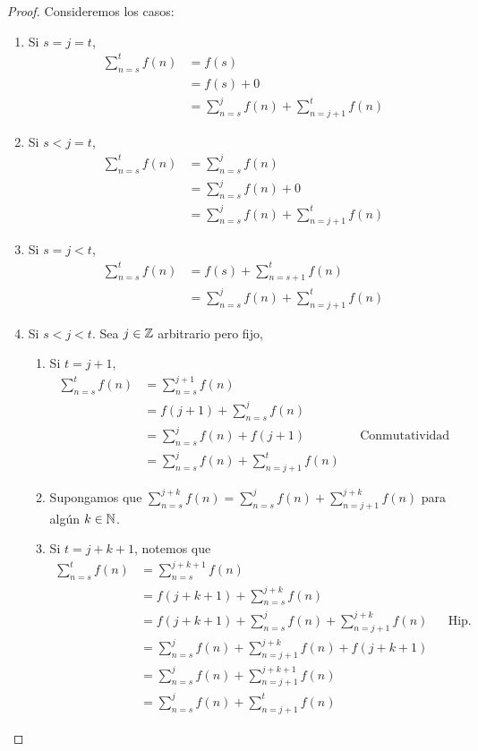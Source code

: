 \begin{enumerate}[label=\alph*)]
  \begin{proof}
    Consideremos los casos:
    \begin{enumerate}[label=\Roman*)]
      \item Si $s=j=t$,
      \begin{align*}
        \sum_{n=s}^{t}f(n) &= f(s)\\
        &= f(s) + 0\\
        &= \sum_{n=s}^{j}f(n) + \sum_{n=j+1}^{t}f(n)
      \end{align*}
      \item Si $s<j=t$,
      \begin{align*}
        \sum_{n=s}^{t}f(n) &= \sum_{n=s}^{j}f(n)\\
        &= \sum_{n=s}^{j}f(n) + 0\\
        &= \sum_{n=s}^{j}f(n) + \sum_{n=j+1}^{t}f(n)
      \end{align*}
      \item Si $s=j<t$,
      \begin{align*}
        \sum_{n=s}^{t}f(n) &= f(s) + \sum_{n=s+1}^{t}f(n)\\
        &= \sum_{n=s}^{j}f(n) + \sum_{n=j+1}^{t}f(n)
      \end{align*}
      \item Si $s<j<t$.
        Sea $j\in \mathbb{Z}$ arbitrario pero fijo,
        \begin{enumerate}[label=\roman*)]
          \item Si $t=j+1$,
          \begin{align*}
            \sum_{n=s}^{t}f(n) &=  \sum_{n=s}^{j+1}f(n)\\
            &= f(j+1) + \sum_{n=s}^{j}f(n)\\
            &= \sum_{n=s}^{j}f(n) + f(j+1) && \text{Conmutatividad}\\
            &= \sum_{n=s}^{j}f(n) + \sum_{n=j+1}^{t}f(n)
          \end{align*}
          \item Supongamos que $\sum_{n=s}^{j+k}f(n) = \sum_{n=s}^{j}f(n) + \sum_{n=j+1}^{j+k}f(n)$ para algún $k\in \mathbb{N}$.
          \item Si $t=j+k+1$, notemos que
          \begin{align*}
            \sum_{n=s}^{t}f(n) &= \sum_{n=s}^{j+k+1}f(n)\\
            &= f(j+k+1) + \sum_{n=s}^{j+k}f(n)\\
            &= f(j+k+1) + \sum_{n=s}^{j}f(n) + \sum_{n=j+1}^{j+k}f(n) && \text{Hip. Ind.}\\
            &= \sum_{n=s}^{j}f(n) + \sum_{n=j+1}^{j+k}f(n) +f(j+k+1)\\
            &= \sum_{n=s}^{j}f(n) + \sum_{n=j+1}^{j+k+1}f(n)\\
            &= \sum_{n=s}^{j}f(n) + \sum_{n=j+1}^{t}f(n)
          \end{align*}
        \end{enumerate}
    \end{enumerate}
  \end{proof}


\end{enumerate}

